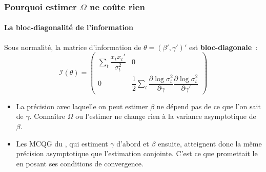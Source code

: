 \documentclass[10pt]{beamer}
\begin{document}
\begin{frame}
  \frametitle{Pourquoi estimer $\Omega$ ne coûte rien}
  \framesubtitle{La bloc-diagonalité de l'information}

  \begin{prop}\label{prop:information:bloc}
    Sous normalité, la matrice d'information de $\theta=(\beta',\gamma')'$ est
    \textbf{bloc-diagonale}~:
    \[
      \mathcal I(\theta) =
      \begin{pmatrix}
        \sum_t \dfrac{x_tx_t'}{\sigma_t^2} & 0\\[2ex]
        0 & \dfrac{1}{2}\sum_t
        \dfrac{\partial \log\sigma_t^2}{\partial\gamma}
        \dfrac{\partial \log\sigma_t^2}{\partial\gamma'}
      \end{pmatrix}
    \]
  \end{prop}

  \bigskip

  \begin{itemize}

  \item[$\Rightarrow$] La précision avec laquelle on peut estimer $\beta$ ne
    dépend pas de ce que l'on sait de $\gamma$. Connaître $\Omega$ ou l'estimer
    ne change rien à la variance asymptotique de $\beta$.\newline

  \item[$\Rightarrow$] Les MCQG du , qui estiment $\gamma$
    d'abord et $\beta$ ensuite, atteignent donc la même précision asymptotique
    que l'estimation conjointe. C'est ce que promettait le  en
    posant ses conditions de convergence.

  \end{itemize}

\end{frame}
\end{document}
